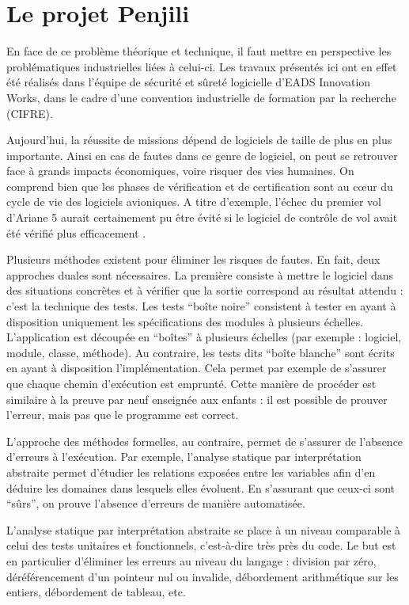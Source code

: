 \section{Le projet Penjili}

En face de ce problème théorique et technique, il faut mettre en perspective les
problématiques industrielles liées à celui-ci. Les travaux présentés ici ont en
effet été réalisés dans l'équipe de sécurité et sûreté logicielle d'EADS
Innovation Works, dans le cadre d'une convention industrielle de formation par
la recherche (CIFRE).

Aujourd'hui, la réussite de missions dépend de logiciels de taille de plus en
plus importante. Ainsi en cas de fautes dans ce genre de logiciel, on peut se
retrouver face à grands impacts économiques, voire risquer des vies humaines. On
comprend bien que les phases de vérification et de certification sont au cœur
du cycle de vie des logiciels avioniques. A titre d'exemple, l'échec du premier
vol d'Ariane 5 aurait certainement pu être évité si le logiciel de contrôle de
vol avait été vérifié plus efficacement \cite{Ariane501}.

Plusieurs méthodes existent pour éliminer les risques de fautes. En fait, deux
approches duales sont nécessaires. La première consiste à mettre le logiciel
dans des situations concrètes et à vérifier que la sortie correspond au résultat
attendu : c'est la technique des tests.  Les tests \enquote{boîte noire}
consistent à tester en ayant à disposition uniquement les spécifications des
modules à plusieurs échelles. L'application est découpée en \enquote{boîtes} à
plusieurs échelles (par exemple : logiciel, module, classe, méthode). Au
contraire, les tests dits \enquote{boîte blanche} sont écrits en ayant à
disposition l'implémentation. Cela permet par exemple de s'assurer que chaque
chemin d'exécution est emprunté. Cette manière de procéder est similaire à la
preuve par neuf enseignée aux enfants : il est possible de prouver l'erreur,
mais pas que le programme est correct.

L'approche des méthodes formelles, au contraire, permet de s'assurer de
l'absence d'erreurs à l'exécution. Par exemple, l'analyse statique par
interprétation abstraite permet d'étudier les relations exposées entre les
variables afin d'en déduire les domaines dans lesquels elles évoluent. En
s'assurant que ceux-ci sont \enquote{sûrs}, on prouve l'absence d'erreurs de
manière automatisée.

L'analyse statique par interprétation abstraite se place à un niveau comparable
à celui des tests unitaires et fonctionnels, c'est-à-dire très près du code. Le
but est en particulier d'éliminer les erreurs au niveau du langage : division
par zéro, déréférencement d'un pointeur nul ou invalide, débordement
arithmétique sur les entiers, débordement de tableau, etc.

